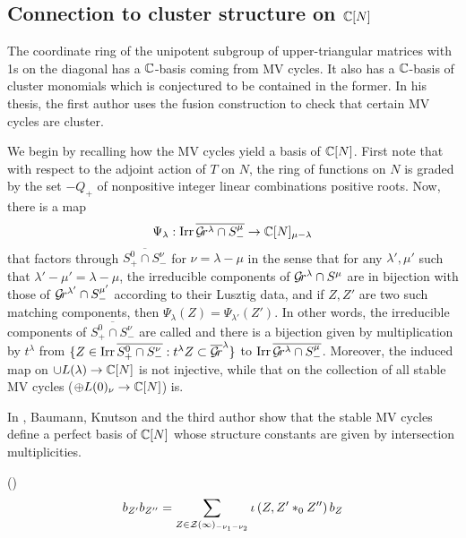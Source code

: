 \documentclass{article} %
\begin{document}
\subsection{Connection to cluster structure on $\mathbb C[N]$}
% 
The coordinate ring of the unipotent subgroup of upper-triangular matrices with 1s on the diagonal has a $\mathbb C$-basis coming from MV cycles. It also has a $\mathbb C$-basis of cluster monomials which is conjectured to be contained in the former.  In his thesis, the first author uses the fusion construction to check that certain MV cycles are cluster. 

We begin by recalling how the MV cycles yield a basis of $\mathbb C[N]$. First note that with respect to the adjoint action of $T$ on $N$, the ring of functions on $N$ is graded by the set $-Q_+$ of nonpositive integer linear combinations positive roots. 
% 
Now, there is a map 
$$
    \Psi_\lambda: \operatorname{Irr} \overline{\mathcal{G}\!r^\lambda\cap S^\mu_-} \to \mathbb C[N]_{\mu - \lambda}
$$ 
that factors through $\overline{S^0_+\cap S^\nu_-}$ for $\nu = \lambda - \mu$ in the sense that for any $\lambda',\mu'$ such that $\lambda' - \mu' = \lambda - \mu$, the irreducible components of $\mathcal{G}\!r^\lambda\cap S^\mu$ are in bijection with those of $\mathcal{G}\!r^{\lambda'}\cap S^{\mu'}_-$ according to their Lusztig data, and if $Z,Z'$ are two such matching components, then $\Psi_\lambda(Z) = \Psi_{\lambda'}(Z')$. 
% 
In other words, the irreducible components of $ \overline{S^0_+\cap S^\nu_-}$ are called  and there is a bijection given by multiplication by $t^\lambda$ from $\{Z\in \operatorname{Irr} \overline{S^0_+\cap S^\nu_-} : t^\lambda Z \subset\overline{\mathcal{G}\!r}^\lambda\}$ to $\operatorname{Irr} \overline{\mathcal{G}\!r^\lambda\cap S^\mu_-} $. Moreover, the induced map on $\cup L(\lambda)\to\mathbb C[N]$ is not injective, while that on the collection of all stable MV cycles ($\oplus L(0)_\nu\to\mathbb C[N]$) is. 

In \cite{baumann2019mirkovic}, Baumann, Knutson and the third author show that the stable MV cycles define a perfect basis of $\mathbb C[N]$ whose structure constants are given by intersection multiplicities. 
% 

\begin{theorem}
    (\cite[Theorem~7.11]{baumann2019mirkovic})
$$
b_{Z'}b_{Z''} = \sum_{Z\in\mathcal Z(\infty)_{-\nu_1 - \nu_2}} \iota\left(
    Z, Z' \ast_0 Z''
\right) b_Z 
$$
\end{theorem}
\end{document}
